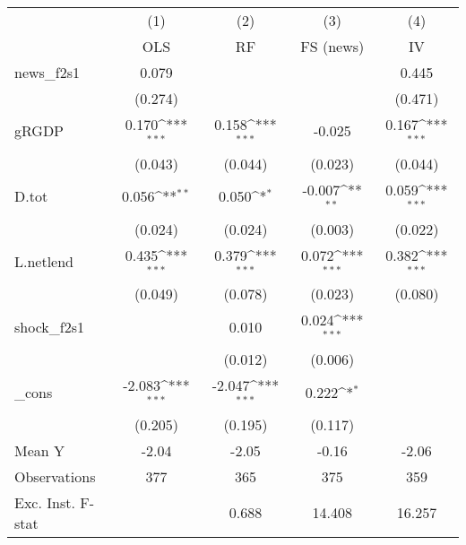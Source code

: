{
\def\sym#1{\ifmmode^{#1}\else\(^{#1}\)\fi}
\begin{tabular}{l*{4}{c}}
\toprule
            &\multicolumn{1}{c}{(1)}&\multicolumn{1}{c}{(2)}&\multicolumn{1}{c}{(3)}&\multicolumn{1}{c}{(4)}\\
            &\multicolumn{1}{c}{OLS}&\multicolumn{1}{c}{RF}&\multicolumn{1}{c}{FS (news)}&\multicolumn{1}{c}{IV}\\
\midrule
news\_f2s1   &       0.079         &                     &                     &       0.445         \\
            &     (0.274)         &                     &                     &     (0.471)         \\
\addlinespace
gRGDP       &       0.170\sym{***}&       0.158\sym{***}&      -0.025         &       0.167\sym{***}\\
            &     (0.043)         &     (0.044)         &     (0.023)         &     (0.044)         \\
\addlinespace
D.tot       &       0.056\sym{**} &       0.050\sym{*}  &      -0.007\sym{**} &       0.059\sym{***}\\
            &     (0.024)         &     (0.024)         &     (0.003)         &     (0.022)         \\
\addlinespace
L.netlend   &       0.435\sym{***}&       0.379\sym{***}&       0.072\sym{***}&       0.382\sym{***}\\
            &     (0.049)         &     (0.078)         &     (0.023)         &     (0.080)         \\
\addlinespace
shock\_f2s1  &                     &       0.010         &       0.024\sym{***}&                     \\
            &                     &     (0.012)         &     (0.006)         &                     \\
\addlinespace
\_cons      &      -2.083\sym{***}&      -2.047\sym{***}&       0.222\sym{*}  &                     \\
            &     (0.205)         &     (0.195)         &     (0.117)         &                     \\
\midrule
Mean Y      &       -2.04         &       -2.05         &       -0.16         &       -2.06         \\
Observations&         377         &         365         &         375         &         359         \\
Exc. Inst. F-stat&                     &       0.688         &      14.408         &      16.257         \\
\bottomrule
\end{tabular}
}
